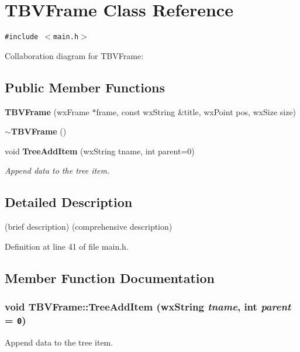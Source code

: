 \section{TBVFrame Class Reference}
\label{class_t_b_v_frame}
{\tt \#include $<$main.h$>$}

Collaboration diagram for TBVFrame:\subsection*{Public Member Functions}
\begin{CompactItemize}
\item 
{\bf TBVFrame} (wx\-Frame $\ast$frame, const wx\-String \&title, wx\-Point pos, wx\-Size size)\label{class_t_b_v_frame_aa1d418070a0187e1e77a346b3e68722}

\item 
{\bf $\sim$TBVFrame} ()\label{class_t_b_v_frame_729c2bc9310ec2954ec388663bd43241}

\item 
void {\bf Tree\-Add\-Item} (wx\-String tname, int parent=0)
\begin{CompactList}\small\item\em Append data to the tree item. \item\end{CompactList}\end{CompactItemize}


\subsection{Detailed Description}
(brief description)  (comprehensive description) 



Definition at line 41 of file main.h.

\subsection{Member Function Documentation}
\subsubsection{\setlength{\rightskip}{0pt plus 5cm}void TBVFrame::Tree\-Add\-Item (wx\-String {\em tname}, int {\em parent} = {\tt 0})}\label{class_t_b_v_frame_5b35fee9a0c0f4d9c5eb5bc71bf4730c}


Append data to the tree item. 

